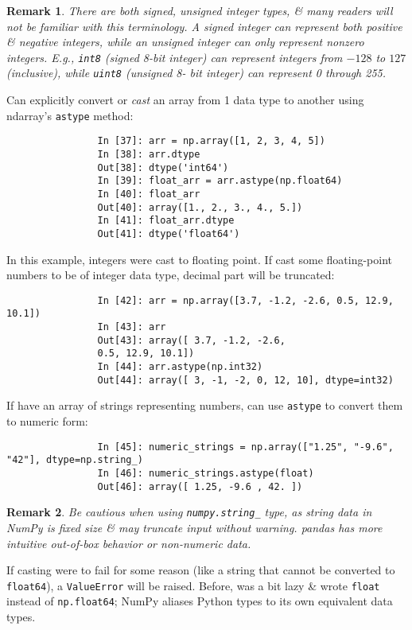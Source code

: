 \documentclass{article}
\newtheorem{remark}{Remark}
\begin{document}
\begin{itemize}
\begin{itemize}
\begin{itemize}
			\begin{remark}
				There are both \emph{signed, unsigned} integer types, \& many readers will not be familiar with this terminology. A \emph{signed} integer can represent both positive \& negative integers, while an \emph{unsigned} integer can only represent nonzero integers. E.g., {\tt int8} (signed 8-bit integer) can represent integers from $-128$ to $127$ (inclusive), while {\tt uint8} (unsigned 8- bit integer) can represent  0 through 255.
			\end{remark}
			Can explicitly convert or {\it cast} an array from 1 data type to another using ndarray's {\tt astype} method:
			\begin{verbatim}
				In [37]: arr = np.array([1, 2, 3, 4, 5])
				In [38]: arr.dtype
				Out[38]: dtype('int64')
				In [39]: float_arr = arr.astype(np.float64)
				In [40]: float_arr
				Out[40]: array([1., 2., 3., 4., 5.])
				In [41]: float_arr.dtype
				Out[41]: dtype('float64')
			\end{verbatim}
			In this example, integers were cast to floating point. If cast some floating-point numbers to be of integer data type, decimal part will be truncated:
			\begin{verbatim}
				In [42]: arr = np.array([3.7, -1.2, -2.6, 0.5, 12.9, 10.1])
				In [43]: arr
				Out[43]: array([ 3.7, -1.2, -2.6,
				0.5, 12.9, 10.1])
				In [44]: arr.astype(np.int32)
				Out[44]: array([ 3, -1, -2, 0, 12, 10], dtype=int32)
			\end{verbatim}
			If have an array of strings representing numbers, can use {\tt astype} to convert them to numeric form:
			\begin{verbatim}
				In [45]: numeric_strings = np.array(["1.25", "-9.6", "42"], dtype=np.string_)
				In [46]: numeric_strings.astype(float)
				Out[46]: array([ 1.25, -9.6 , 42. ])
			\end{verbatim}
			
			\begin{remark}
				Be cautious when using \verb|numpy.string_| type, as string data in NumPy is fixed size \& may truncate input without warning. pandas has more intuitive out-of-box behavior or non-numeric data.
			\end{remark}
			If casting were to fail for some reason (like a string that cannot be converted to {\tt float64}), a {\tt ValueError} will be raised. Before, was a bit lazy \& wrote {\tt float} instead of {\tt np.float64}; NumPy aliases Python types to its own equivalent data types.
			

\end{itemize}
\end{itemize}
\end{itemize}
\end{document}
